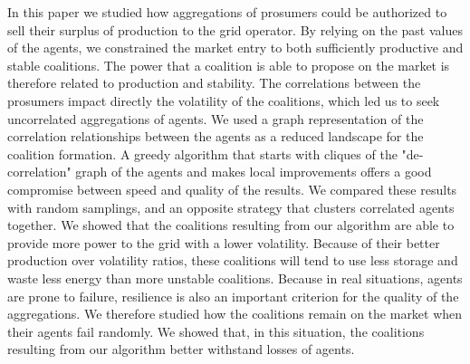 \documentclass[journal]{IEEEtran}
\begin{document}
In this paper we studied how aggregations of prosumers could be authorized to sell their surplus of production to the grid operator. By relying on the past values of the agents, we constrained the market entry to both sufficiently productive and stable coalitions. The power that a coalition is able to propose on the market is therefore related to production and stability. The correlations between the prosumers impact directly the volatility of the coalitions, which led us to seek uncorrelated aggregations of agents. We used a graph representation of the correlation relationships between the agents as a reduced landscape for the coalition formation. A greedy algorithm that starts with cliques of the "de-correlation" graph of the agents and makes local improvements offers a good compromise between speed and quality of the results. We compared these results with random samplings, and an opposite strategy that clusters correlated agents together. We showed that the coalitions resulting from our algorithm are able to provide more power to the grid with a lower volatility. Because of their better production over volatility ratios, these coalitions will tend to use less storage and waste less energy than more unstable coalitions. Because in real situations, agents are prone to failure, resilience is also an important criterion for the quality of the aggregations. We therefore studied how the coalitions remain on the market when their agents fail randomly. We showed that, in this situation, the coalitions resulting from our algorithm better withstand losses of agents.

%
%

  

\end{document}
